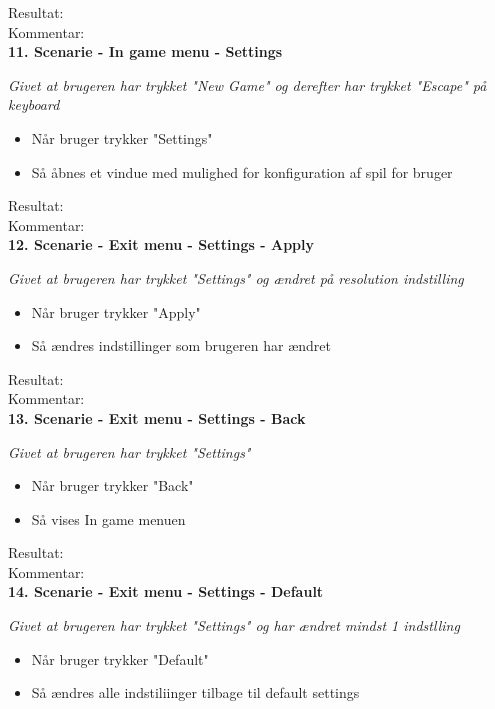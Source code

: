 Resultat:\\
Kommentar:\\

\textbf{11. Scenarie - In game menu - Settings}

\textit{Givet at brugeren har trykket "New Game" og derefter har trykket "Escape" på keyboard}

\begin{itemize}
  \item Når bruger trykker "Settings"
  \item Så åbnes et vindue med mulighed for konfiguration af spil for bruger
\end{itemize}

Resultat:\\
Kommentar:\\

\textbf{12. Scenarie - Exit menu - Settings - Apply}

\textit{Givet at brugeren har trykket "Settings" og ændret på resolution indstilling}

\begin{itemize}
  \item Når bruger trykker "Apply"
  \item Så ændres indstillinger som brugeren har ændret
\end{itemize}

Resultat:\\
Kommentar:\\

\textbf{13. Scenarie - Exit menu - Settings - Back}

\textit{Givet at brugeren har trykket "Settings"}

\begin{itemize}
  \item Når bruger trykker "Back"
  \item Så vises In game menuen
\end{itemize}

Resultat:\\
Kommentar:\\

\textbf{14. Scenarie - Exit menu - Settings - Default}

\textit{Givet at brugeren har trykket "Settings" og har ændret mindst 1 indstlling}

\begin{itemize}
  \item Når bruger trykker "Default"
  \item Så ændres alle indstiliinger tilbage til default settings
\end{itemize}

